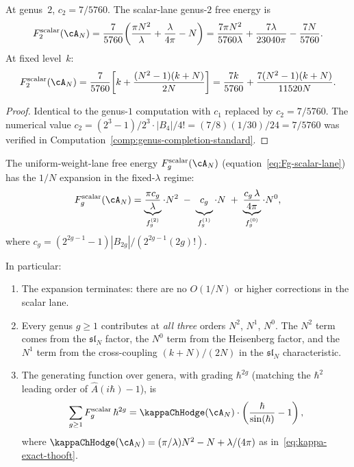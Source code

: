 \begin{computation}
\label{comp:genus2-1overN}
At genus~$2$, $c_2 = 7/5760$.
The scalar-lane genus-$2$ free energy is
\begin{equation}\label{eq:F2-1overN}
F_2^{\mathrm{scalar}}(\cA_N)
= \frac{7}{5760}\!\left(
\frac{\pi N^2}{\lambda}
+ \frac{\lambda}{4\pi}
- N
\right)
= \frac{7\pi N^2}{5760\lambda}
+ \frac{7\lambda}{23040\pi}
- \frac{7N}{5760}.
\end{equation}
At fixed level~$k$:
\begin{equation}\label{eq:F2-fixed-k}
F_2^{\mathrm{scalar}}(\cA_N)
= \frac{7}{5760}\!\left[
k + \frac{(N^2-1)(k+N)}{2N}\right]
= \frac{7k}{5760} + \frac{7(N^2-1)(k+N)}{11520N}.
\end{equation}
\end{computation}

\begin{proof}
Identical to the genus-$1$ computation with $c_1$ replaced by
$c_2 = 7/5760$. The numerical value
$c_2 = (2^3-1)/2^3 \cdot |B_4|/4! = (7/8)(1/30)/24 = 7/5760$
was verified in Computation~\ref{comp:genus-completion-standard}.
\end{proof}

\begin{theorem}
\label{thm:scalar-lane-1overN-structure}
The uniform-weight-lane free energy
$F_g^{\mathrm{scalar}}(\cA_N)$ (equation~\eqref{eq:Fg-scalar-lane}) has
the $1/N$ expansion in the fixed-$\lambda$ regime:
\begin{equation}\label{eq:Fg-1overN-structure}
F_g^{\mathrm{scalar}}(\cA_N)
= \underbrace{\frac{\pi c_g}{\lambda}}_{f_g^{(2)}}
\cdot N^2
\;-\; \underbrace{c_g\vphantom{\frac{1}{1}}}_{f_g^{(1)}}
\cdot N
\;+\; \underbrace{\frac{c_g\,\lambda}{4\pi}}_{f_g^{(0)}}
\cdot N^0,
\end{equation}
where $c_g = (2^{2g-1}-1) |B_{2g}|/(2^{2g-1}(2g)!)$.

In particular:
\begin{enumerate}[label=\textup{(\roman*)}]
\item The expansion terminates: there are no $O(1/N)$ or higher
 corrections in the scalar lane.
\item Every genus $g \geq 1$ contributes at \emph{all three} orders
 $N^2$, $N^1$, $N^0$. The $N^2$ term comes from the
 $\mathfrak{sl}_N$ factor, the $N^0$ term from the Heisenberg factor,
 and the $N^1$ term from the cross-coupling $(k+N)/(2N)$ in the
 $\mathfrak{sl}_N$ characteristic.
\item The generating function over genera, with grading
 $\hbar^{2g}$ (matching the $\hbar^2$ leading order of $\hat{A}(i\hbar) - 1$), is
 \begin{equation}\label{eq:Fg-generating-1overN}
 \sum_{g \ge 1} F_g^{\mathrm{scalar}} \,\hbar^{2g}
 = \kappaChHodge(\cA_N) \cdot \left(\frac{\hbar}{\sin(\hbar)} - 1\right),
 \end{equation}
 where $\kappaChHodge(\cA_N) = (\pi/\lambda)N^2 - N + \lambda/(4\pi)$
 as in~\eqref{eq:kappa-exact-thooft}.
\end{enumerate}
\end{theorem}

